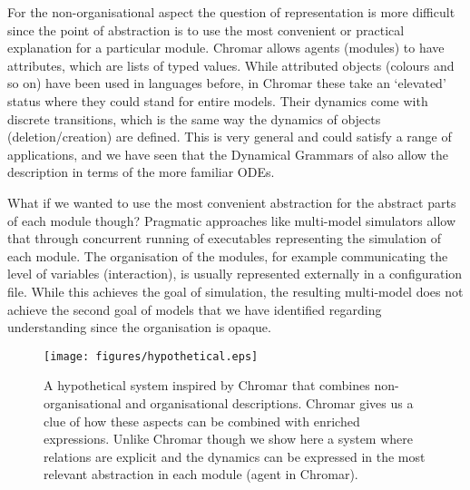 For the non-organisational aspect the question of representation is more
difficult since the point of abstraction is to use the most convenient or
practical explanation for a particular module. Chromar allows agents (modules)
to have attributes, which are lists of typed values. While attributed objects
(colours and so on) have been used in languages before, in Chromar these take an
`elevated' status where they could stand for entire models. Their dynamics come with
discrete transitions, which is the same way the dynamics of objects
(deletion/creation) are defined. This is very general and could satisfy a range
of applications, and we have seen that the Dynamical Grammars of
\citet{mjolsness2006stochastic} also allow the description in terms of the more
familiar ODEs. 

What if we wanted to use the most convenient abstraction for the abstract parts
of each module though? Pragmatic approaches like multi-model simulators
\citep{erbm_mois_2015, cis_2018} allow that through concurrent running of
executables representing the simulation of each module. The organisation of the
modules, for example communicating the level of variables (interaction), is
usually represented externally in a configuration file. While this achieves the
goal of simulation, the resulting multi-model does not achieve the second goal
of models that we have identified regarding understanding since the organisation
is opaque.

\begin{figure}[tb]
  \centering
  \texttt{[image: figures/hypothetical.eps]}
  \caption{A hypothetical system inspired by Chromar that combines
    non-organisational and organisational descriptions. Chromar gives us a clue
    of how these aspects can be combined with enriched expressions. Unlike
    Chromar though we show here a system where relations are explicit and the
    dynamics can be expressed in the most relevant abstraction in each module
    (agent in Chromar).}
    \label{fig:hyp}
\end{figure}

